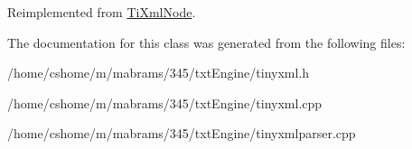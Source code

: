 \-Reimplemented from \hyperlink{class_ti_xml_node_aa65d000223187d22a4dcebd7479e9ebc}{\-Ti\-Xml\-Node}.



\-The documentation for this class was generated from the following files\-:\begin{DoxyCompactItemize}
\item 
/home/cshome/m/mabrams/345/txt\-Engine/tinyxml.\-h\item 
/home/cshome/m/mabrams/345/txt\-Engine/tinyxml.\-cpp\item 
/home/cshome/m/mabrams/345/txt\-Engine/tinyxmlparser.\-cpp\end{DoxyCompactItemize}

